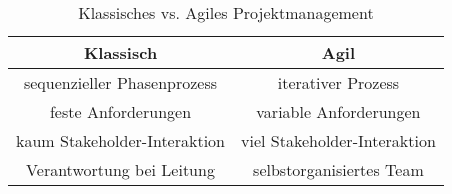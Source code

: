 \begin{table}
  \centering
  \begin{tabular}{c|c}
    Klassisch                    & Agil                         \\
    \hline
    sequenzieller Phasenprozess  & iterativer Prozess           \\
    feste Anforderungen          & variable Anforderungen       \\
    kaum Stakeholder-Interaktion & viel Stakeholder-Interaktion \\
    Verantwortung bei Leitung    & selbstorganisiertes Team     \\
  \end{tabular}
  \caption{Klassisches vs. Agiles Projektmanagement}
\end{table}